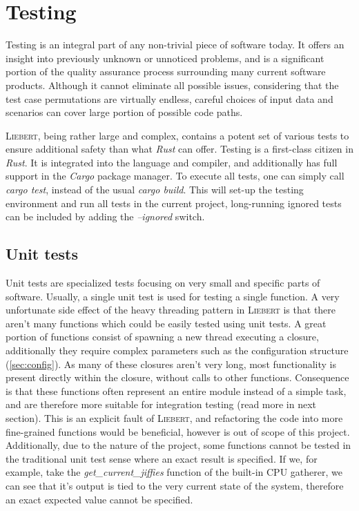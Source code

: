 \section{Testing}
    Testing is an integral part of any non-trivial piece of software today. It offers an insight into previously unknown or unnoticed problems, and is a significant portion of the quality assurance process surrounding many current software products. Although it cannot eliminate all possible issues, considering that the test case permutations are virtually endless, careful choices of input data and scenarios can cover large portion of possible code paths.
    
    \textsc{Liebert}, being rather large and complex, contains a potent set of various tests to ensure additional safety than what \textit{Rust} can offer. Testing is a first-class citizen in \textit{Rust}. It is integrated into the language and compiler, and additionally has full support in the \textit{Cargo} package manager. To execute all tests, one can simply call \textit{cargo test}, instead of the usual \textit{cargo build}. This will set-up the testing environment and run all tests in the current project, long-running ignored tests can be included by adding the \textit{--ignored} switch.
    
    
    \subsection{Unit tests}
        Unit tests are specialized tests focusing on very small and specific parts of software. Usually, a single unit test is used for testing a single function. A very unfortunate side effect of the heavy threading pattern in \textsc{Liebert} is that there aren't many functions which could be easily tested using unit tests. A great portion of functions consist of spawning a new thread executing a closure, additionally they require complex parameters such as the configuration structure (\autoref{sec:config}). As many of these closures aren't very long, most functionality is present directly within the closure, without calls to other functions. Consequence is that these functions often represent an entire module instead of a simple task, and are therefore more suitable for integration testing (read more in next section). This is an explicit fault of \textsc{Liebert}, and refactoring the code into more fine-grained functions would be beneficial, however is out of scope of this project. Additionally, due to the nature of the project, some functions cannot be tested in the traditional unit test sense where an exact result is specified. If we, for example, take the \textit{get\_current\_jiffies} function of the built-in CPU gatherer, we can see that it's output is tied to the very current state of the system, therefore an exact expected value cannot be specified.
        
